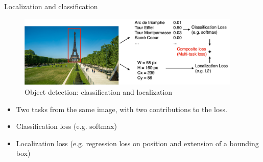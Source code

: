 \documentclass[xcolor=pdftex,dvipsnames,table]{beamer}
\begin{document}
\begin{frame}{Localization and classification}
\begin{figure}[htb]
   \centering
   \includegraphics[width=0.95\textwidth]{../graphics/class_and_loc.pdf}
   \caption{Object detection: classification and localization}
\end{figure}
\begin{itemize}
   \item Two tasks from the same image, with two contributions to the loss.
   \item Classification loss (e.g. softmax)
   \item Localization loss (e.g. regression loss on position and extension of a bounding box)
\end{itemize}
\end{frame}
\end{document}
